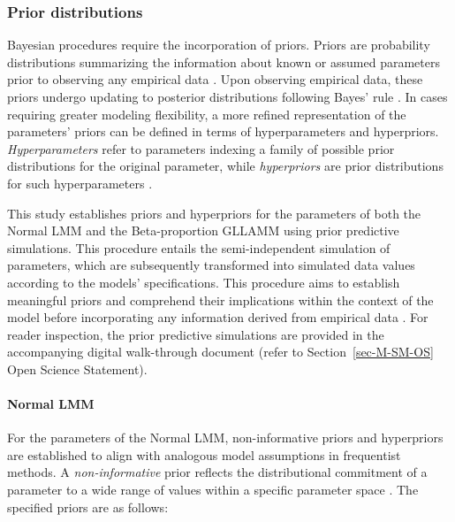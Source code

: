 \documentclass[
  authoryear,
  preprint,
  1p]{elsarticle}
\let\oldparagraph\paragraph
\renewcommand{\paragraph}[1]{\oldparagraph{#1}\mbox{}}
\begin{document}
\subsubsection{Prior distributions}\label{sec-M-SM-P}

Bayesian procedures require the incorporation of priors. Priors are
probability distributions summarizing the information about known or
assumed parameters prior to observing any empirical data
\citep{Everitt_et_al_2010}. Upon observing empirical data, these priors
undergo updating to posterior distributions following Bayes' rule
\citep{Jeffreys_1998}. In cases requiring greater modeling flexibility,
a more refined representation of the parameters' priors can be defined
in terms of hyperparameters and hyperpriors. \emph{Hyperparameters}
refer to parameters indexing a family of possible prior distributions
for the original parameter, while \emph{hyperpriors} are prior
distributions for such hyperparameters \citep{Everitt_et_al_2010}.

This study establishes priors and hyperpriors for the parameters of both
the Normal LMM and the Beta-proportion GLLAMM using prior predictive
simulations. This procedure entails the semi-independent simulation of
parameters, which are subsequently transformed into simulated data
values according to the models' specifications. This procedure aims to
establish meaningful priors and comprehend their implications within the
context of the model before incorporating any information derived from
empirical data \citep{McElreath_2020}. For reader inspection, the prior
predictive simulations are provided in the accompanying digital
walk-through document (refer to Section~\ref{sec-M-SM-OS} Open Science
Statement).

\paragraph{Normal LMM}\label{sec-M-SM-P-NLMM}

For the parameters of the Normal LMM, non-informative priors and
hyperpriors are established to align with analogous model assumptions in
frequentist methods. A \emph{non-informative} prior reflects the
distributional commitment of a parameter to a wide range of values
within a specific parameter space \citep{Everitt_et_al_2010}. The
specified priors are as follows:
\end{document}
